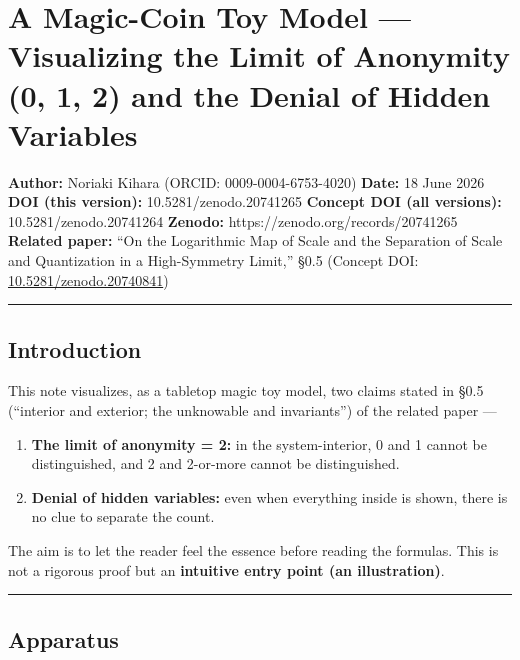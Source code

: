 \documentclass[11pt]{ltjsarticle}
\providecommand{\tightlist}{\setlength{\itemsep}{0pt}\setlength{\parskip}{0pt}}
\begin{document}
\section{A Magic-Coin Toy Model --- Visualizing the Limit of Anonymity
(0, 1, 2) and the Denial of Hidden
Variables}\label{a-magic-coin-toy-model-visualizing-the-limit-of-anonymity-0-1-2-and-the-denial-of-hidden-variables}

\textbf{Author:} Noriaki Kihara (ORCID: 0009-0004-6753-4020)
\textbf{Date:} 18 June 2026 \textbf{DOI (this version):}
10.5281/zenodo.20741265 \textbf{Concept DOI (all versions):}
10.5281/zenodo.20741264 \textbf{Zenodo:}
https://zenodo.org/records/20741265 \textbf{Related paper:} ``On the
Logarithmic Map of Scale and the Separation of Scale and Quantization in
a High-Symmetry Limit,'' §0.5 (Concept DOI:
\href{https://doi.org/10.5281/zenodo.20740841}{10.5281/zenodo.20740841})

\begin{center}\rule{0.5\linewidth}{0.5pt}\end{center}

\subsection{Introduction}\label{introduction}

This note visualizes, as a tabletop magic toy model, two claims stated
in §0.5 (``interior and exterior; the unknowable and invariants'') of
the related paper ---

\begin{enumerate}
\def\labelenumi{\arabic{enumi}.}
\tightlist
\item
  \textbf{The limit of anonymity = 2:} in the system-interior, 0 and 1
  cannot be distinguished, and 2 and 2-or-more cannot be distinguished.
\item
  \textbf{Denial of hidden variables:} even when everything inside is
  shown, there is no clue to separate the count.
\end{enumerate}

The aim is to let the reader feel the essence before reading the
formulas. This is not a rigorous proof but an \textbf{intuitive entry
point (an illustration)}.

\begin{center}\rule{0.5\linewidth}{0.5pt}\end{center}

\subsection{Apparatus}\label{apparatus}
\end{document}
